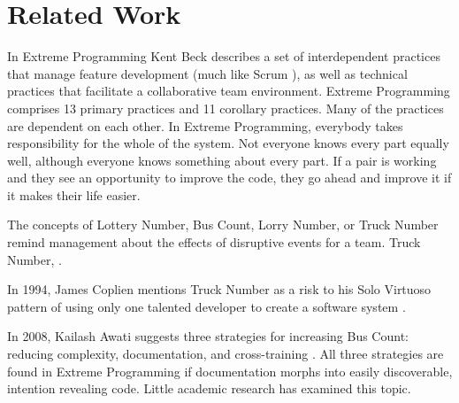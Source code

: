 \begin{table}[]
\section{Related Work}
\label{RelatedWork}
In Extreme Programming \cite{ExtremeProgramming2004} Kent Beck describes a set of interdependent practices that manage feature development (much like Scrum \cite{Scrum}), as well as technical practices that facilitate a collaborative team environment.  Extreme Programming comprises 13 primary practices and 11 corollary practices. Many of the practices are dependent on each other.  {In Extreme Programming, everybody takes responsibility for the whole of the system. Not everyone knows every part equally well, although everyone knows something about every part. If a pair is working and they see an opportunity to improve the code, they go ahead and improve it if it makes their life easier.}  \cite{ExtremeProgramming2000}



The concepts of Lottery Number, Bus Count, Lorry Number, or Truck Number remind management about the effects of disruptive events for a team. Truck Number,  \cite{WikiTruckNumber}. 

In 1994, James Coplien mentions Truck Number as a risk to his Solo Virtuoso pattern of using only one talented developer to create a software system \cite{Coplien1994}. 

In 2008, Kailash Awati suggests three strategies for increasing Bus Count: reducing complexity, documentation, and cross-training \cite{AwatiBusFactor}. All three strategies are found in Extreme Programming if documentation morphs into easily discoverable, intention revealing code. Little academic research has examined this topic. 




\end{table}
